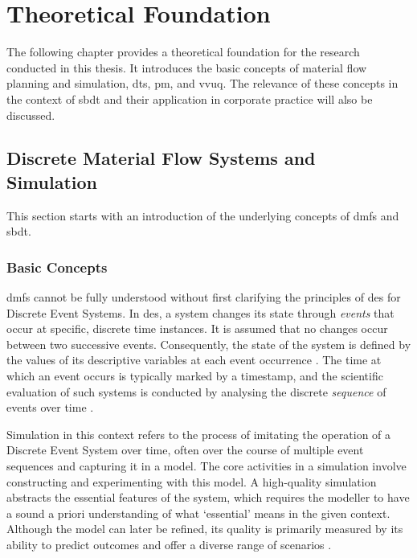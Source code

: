 \chapter{Theoretical Foundation}
\label{chap:theory}

The following chapter provides a theoretical foundation for the research conducted in this thesis. It introduces the basic concepts of material flow planning and simulation, \gls{dt}s, \gls{pm}, and \gls{vvuq}. The relevance of these concepts in the context of \gls{sbdt} and their application in corporate practice will also be discussed.


\section{Discrete Material Flow Systems and Simulation}
This section starts with an introduction of the underlying concepts of \gls{dmfs} and \gls{sbdt}.
\label{sec:material-flow}

\subsection{Basic Concepts}
\gls{dmfs} cannot be fully understood without first clarifying the principles of \gls{des} for Discrete Event Systems. In \gls{des}, a system changes its state through \textit{events} that occur at specific, discrete time instances. It is assumed that no changes occur between two successive events. Consequently, the state of the system is defined by the values of its descriptive variables at each event occurrence \autocite{varga2001discrete}. The time at which an event occurs is typically marked by a timestamp, and the scientific evaluation of such systems is conducted by analysing the discrete \textit{sequence} of events over time \autocite{robinson2014simulation}.

Simulation in this context refers to the process of imitating the operation of a Discrete Event System over time, often over the course of multiple event sequences and capturing it in a model. The core activities in a simulation involve constructing and experimenting with this model. A high-quality simulation abstracts the essential features of the system, which requires the modeller to have a sound a priori understanding of what `essential' means in the given context. Although the model can later be refined, its quality is primarily measured by its ability to predict outcomes and offer a diverse range of scenarios \autocite{maria1997introduction}.

